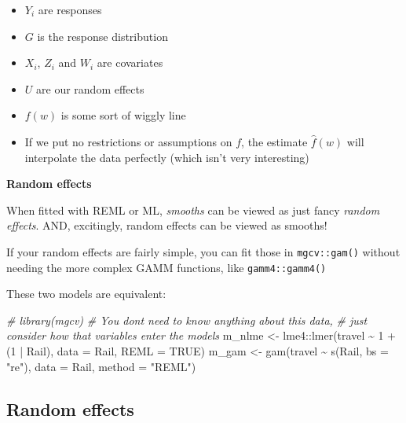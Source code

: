 \documentclass[
  openany]{book}
\newenvironment{Shaded}{\begin{snugshade}}{\end{snugshade}}
\newcommand{\AttributeTok}[1]{\textcolor[rgb]{0.77,0.63,0.00}{#1}}
\newcommand{\CommentTok}[1]{\textcolor[rgb]{0.56,0.35,0.01}{\textit{#1}}}
\newcommand{\ConstantTok}[1]{\textcolor[rgb]{0.00,0.00,0.00}{#1}}
\newcommand{\DecValTok}[1]{\textcolor[rgb]{0.00,0.00,0.81}{#1}}
\newcommand{\FunctionTok}[1]{\textcolor[rgb]{0.00,0.00,0.00}{#1}}
\newcommand{\NormalTok}[1]{#1}
\newcommand{\OtherTok}[1]{\textcolor[rgb]{0.56,0.35,0.01}{#1}}
\newcommand{\SpecialCharTok}[1]{\textcolor[rgb]{0.00,0.00,0.00}{#1}}
\newcommand{\StringTok}[1]{\textcolor[rgb]{0.31,0.60,0.02}{#1}}
\providecommand{\tightlist}{%
  \setlength{\itemsep}{0pt}\setlength{\parskip}{0pt}}
\begin{document}
\begin{itemize}
\tightlist
\item
  \(Y_i\) are responses
\item
  \(G\) is the response distribution
\item
  \(X_i\), \(Z_i\) and \(W_i\) are covariates
\item
  \(U\) are our random effects
\item
  \(f(w)\) is some sort of wiggly line
\item
  If we put no restrictions or assumptions on \(f\), the estimate \(\hat f(w)\) will interpolate the data perfectly (which isn't very interesting)
\end{itemize}

\textbf{Random effects}

When fitted with REML or ML, \emph{smooths} can be viewed as just fancy \emph{random effects}. AND, excitingly, random effects can be viewed as smooths!

If your random effects are fairly simple, you can fit those in \texttt{mgcv::gam()} without needing the more complex GAMM functions, like \texttt{gamm4::gamm4()}

These two models are equivalent:

\begin{Shaded}
\begin{Highlighting}[]
\CommentTok{\# library(mgcv)}
\CommentTok{\# You don\textquotesingle{}t need to know anything about this data, }
\CommentTok{\# just consider how that variables enter the models}
\NormalTok{m\_nlme }\OtherTok{\textless{}{-}}\NormalTok{ lme4}\SpecialCharTok{::}\FunctionTok{lmer}\NormalTok{(travel }\SpecialCharTok{\textasciitilde{}} \DecValTok{1} \SpecialCharTok{+}\NormalTok{ (}\DecValTok{1} \SpecialCharTok{|}\NormalTok{ Rail), }\AttributeTok{data =}\NormalTok{ Rail, }\AttributeTok{REML =} \ConstantTok{TRUE}\NormalTok{) }
\NormalTok{m\_gam  }\OtherTok{\textless{}{-}} \FunctionTok{gam}\NormalTok{(travel }\SpecialCharTok{\textasciitilde{}} \FunctionTok{s}\NormalTok{(Rail, }\AttributeTok{bs =} \StringTok{"re"}\NormalTok{), }\AttributeTok{data =}\NormalTok{ Rail, }\AttributeTok{method =} \StringTok{"REML"}\NormalTok{)}
\end{Highlighting}
\end{Shaded}

\hypertarget{random-effects}{%
\subsection{Random effects}\label{random-effects}}
\end{document}
